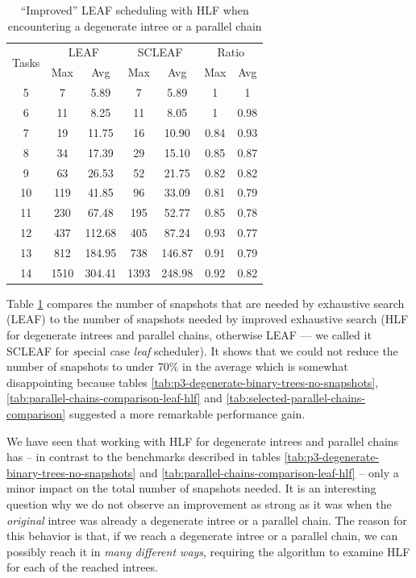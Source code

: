 \begin{table}[th]
  \centering
  \begin{tabular}[ht]{ccccccc}
    \multirow{2}{*}{Tasks} & \multicolumn{2}{c}{LEAF} & \multicolumn{2}{c}{SCLEAF} & \multicolumn{2}{c}{Ratio}\\
    &  Max & Avg & Max & Avg & Max & Avg\\
    \hline
    5 & 7 & 5.89 & 7 & 5.89 & 1 & 1\\
    6 & 11 & 8.25 & 11 & 8.05 & 1 & 0.98 \\
    7 & 19 & 11.75 & 16 & 10.90 & 0.84 & 0.93 \\
    8 & 34 & 17.39 & 29 & 15.10 & 0.85 & 0.87 \\
    9 & 63 & 26.53 & 52 & 21.75 & 0.82 & 0.82 \\
    10 & 119 & 41.85 & 96 & 33.09 & 0.81 & 0.79 \\
    11 & 230 & 67.48 & 195 & 52.77 & 0.85 & 0.78 \\
    12 & 437 & 112.68 & 405 & 87.24 & 0.93 & 0.77 \\
    13 & 812 & 184.95 & 738 & 146.87 & 0.91 & 0.79 \\
    14 & 1510 & 304.41 & 1393 & 248.98 & 0.92 & 0.82
  \end{tabular}
  \caption{``Improved'' LEAF scheduling with HLF when encountering a degenerate intree or a parallel chain}
  \label{tab:improving-leaf-scheduler-benchmark}
\end{table}

Table \ref{tab:improving-leaf-scheduler-benchmark} compares the number of snapshots that are needed by exhaustive search (LEAF) to the number of snapshots needed by improved exhaustive search (HLF for degenerate intrees and parallel chains, otherwise LEAF --- we called it SCLEAF for \emph{s}pecial \emph{c}ase \emph{leaf} scheduler). It shows that we could not reduce the number of snapshots to under 70\% in the average which is somewhat disappointing because tables \ref{tab:p3-degenerate-binary-trees-no-snapshots}, \ref{tab:parallel-chains-comparison-leaf-hlf} and \ref{tab:selected-parallel-chains-comparison} suggested a more remarkable performance gain.

We have seen that working with HLF for degenerate intrees and parallel chains has -- in contrast to the benchmarks described in tables \ref{tab:p3-degenerate-binary-trees-no-snapshots} and \ref{tab:parallel-chains-comparison-leaf-hlf} -- only a minor impact on the total number of snapshots needed. It is an interesting question why we do not observe an improvement as strong as it was when the \emph{original} intree was already a degenerate intree or a parallel chain. The reason for this behavior is that, if we reach a degenerate intree or a parallel chain, we can possibly reach it in \emph{many different ways}, requiring the algorithm to examine HLF for each of the reached intrees. 

